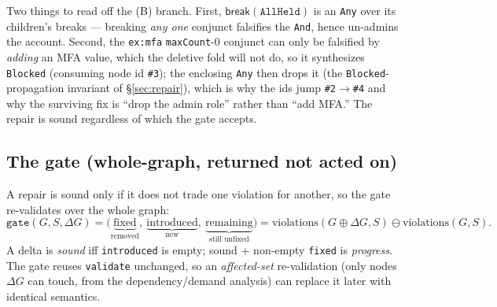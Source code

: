 \documentclass[11pt]{article}
\newcommand{\Break}{\mathsf{break}}
\newcommand{\code}[1]{\texttt{#1}}
\theoremstyle{definition}
\begin{document}
Two things to read off the (B) branch. First, $\Break(\code{AllHeld})$ is an
\code{Any} over its children's breaks --- breaking \emph{any one} conjunct
falsifies the \code{And}, hence un-admins the account. Second, the \code{ex:mfa}
\code{maxCount}-$0$ conjunct can only be falsified by \emph{adding} an MFA value,
which the deletive fold will not do, so it synthesizes \code{Blocked} (consuming
node id \code{\#3}); the enclosing \code{Any} then drops it (the
\code{Blocked}-propagation invariant of \S\ref{sec:repair}), which is why the ids
jump \code{\#2}$\to$\code{\#4} and why the surviving fix is ``drop the admin role''
rather than ``add MFA.'' The repair is sound regardless of which the gate accepts.

\subsection{The gate (whole-graph, returned not acted on)}
A repair is sound only if it does not trade one violation for another, so the gate
re-validates over the whole graph:
\[
\code{gate}(G,S,\Delta G)=\big(\underbrace{\text{fixed}}_{\text{removed}},\ \underbrace{\text{introduced}}_{\text{new}},\ \underbrace{\text{remaining}}_{\text{still unfixed}}\big)
= \mathrm{violations}(G\oplus\Delta G,S)\ominus\mathrm{violations}(G,S).
\]
A delta is \emph{sound} iff \code{introduced} is empty; sound + non-empty
\code{fixed} is \emph{progress}. The gate reuses \code{validate} unchanged, so an
\emph{affected-set} re-validation (only nodes $\Delta G$ can touch, from the
dependency/demand analysis) can replace it later with identical semantics.
\end{document}
